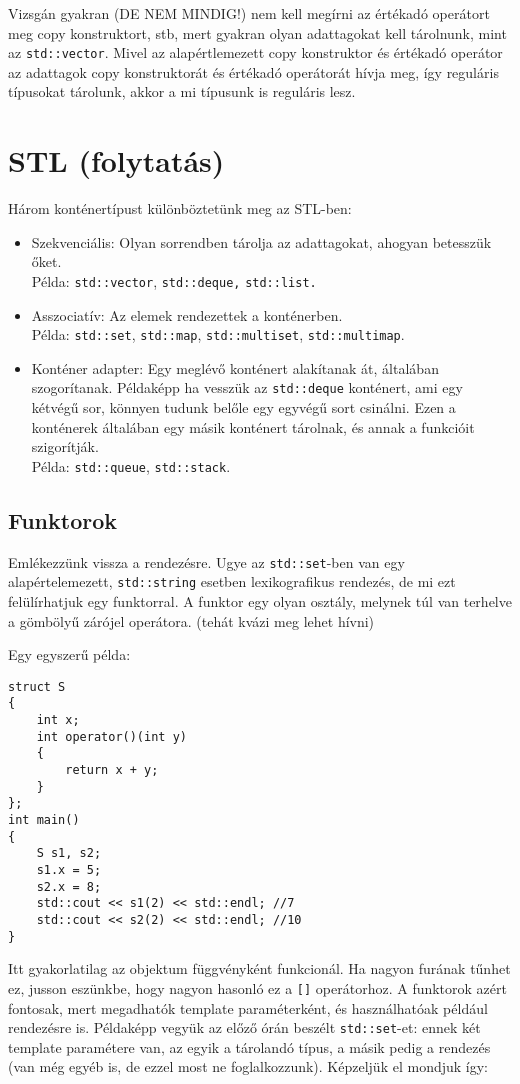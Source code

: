 \documentclass[a4paper,11.5pt]{article}
\begin{document}
	\medskip
	Vizsgán gyakran (DE NEM MINDIG!) nem kell megírni az értékadó operátort meg copy konstruktort, stb, mert gyakran olyan adattagokat kell tárolnunk, mint az \texttt{std::vector}. Mivel az alapértlemezett copy konstruktor és értékadó operátor az adattagok copy konstruktorát és értékadó operátorát hívja meg, így reguláris típusokat tárolunk, akkor a mi típusunk is reguláris lesz.
	\section{STL (folytatás)}
	Három konténertípust különböztetünk meg az STL-ben:
	\begin{itemize}
		\item Szekvenciális: Olyan sorrendben tárolja az adattagokat, ahogyan betesszük őket. \\Példa: \texttt{std::vector}, \texttt{std::deque,} \texttt{std::list.}
		\item Asszociatív: Az elemek rendezettek a konténerben.\\ Példa: \texttt{std::set}, \texttt{std::map}, \texttt{std::multiset}, \texttt{std::multimap}.
		\item Konténer adapter: Egy meglévő konténert alakítanak át, általában szogorítanak. Példaképp ha vesszük az \texttt{std::deque} konténert, ami egy kétvégű sor, könnyen tudunk belőle egy egyvégű sort csinálni. Ezen a konténerek általában egy másik konténert tárolnak, és annak a funkcióit szigorítják.
		\\Példa: \texttt{std::queue}, \texttt{std::stack}.
	\end{itemize}
	\subsection{Funktorok}
	Emlékezzünk vissza a rendezésre. Ugye az \texttt{std::set}-ben van egy alapértelemezett, \texttt{std::string} esetben lexikografikus rendezés, de mi ezt felülírhatjuk egy funktorral. A funktor egy olyan osztály, melynek túl van terhelve a gömbölyű zárójel operátora. (tehát kvázi meg lehet hívni)
	
	\smallskip
	Egy egyszerű példa:
	\begin{lstlisting}
struct S
{
	int x;
	int operator()(int y)
	{
		return x + y;
	}
};
int main()
{
	S s1, s2;
	s1.x = 5;
	s2.x = 8;
	std::cout << s1(2) << std::endl; //7
	std::cout << s2(2) << std::endl; //10
}
	\end{lstlisting}
	Itt gyakorlatilag az objektum függvényként funkcionál. Ha nagyon furának tűnhet ez, jusson eszünkbe, hogy nagyon hasonló ez a \texttt{[]} operátorhoz. A funktorok azért fontosak, mert megadhatók template paraméterként, és használhatóak például rendezésre is. Példaképp vegyük az előző órán beszélt \texttt{std::set}-et: ennek két template paramétere van, az egyik a tárolandó típus, a másik pedig a rendezés (van még egyéb is, de ezzel most ne foglalkozzunk). Képzeljük el mondjuk így:
	
\end{document}
